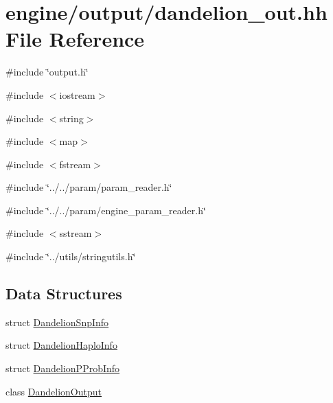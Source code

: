 \hypertarget{dandelion__out_8hh}{
\section{engine/output/dandelion\_\-out.hh File Reference}
\label{dandelion__out_8hh}
}
{\ttfamily \#include \char`\"{}output.h\char`\"{}}\par
{\ttfamily \#include $<$iostream$>$}\par
{\ttfamily \#include $<$string$>$}\par
{\ttfamily \#include $<$map$>$}\par
{\ttfamily \#include $<$fstream$>$}\par
{\ttfamily \#include \char`\"{}../../param/param\_\-reader.h\char`\"{}}\par
{\ttfamily \#include \char`\"{}../../param/engine\_\-param\_\-reader.h\char`\"{}}\par
{\ttfamily \#include $<$sstream$>$}\par
{\ttfamily \#include \char`\"{}../utils/stringutils.h\char`\"{}}\par
\subsection*{Data Structures}
\begin{DoxyCompactItemize}
\item 
struct \hyperlink{structDandelionSnpInfo}{DandelionSnpInfo}
\item 
struct \hyperlink{structDandelionHaploInfo}{DandelionHaploInfo}
\item 
struct \hyperlink{structDandelionPProbInfo}{DandelionPProbInfo}
\item 
class \hyperlink{classDandelionOutput}{DandelionOutput}
\end{DoxyCompactItemize}
